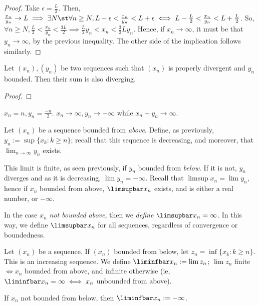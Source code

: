 \documentclass[12pt]{article}
\begin{document}
\begin{proof}
  Take $\epsilon = \frac{L}{2}$. Then, $\frac{x_n}{y_n}\to L \implies \exists N \st \forall n \geq N, L - \epsilon < \frac{x_n}{y_n} < L + \epsilon \iff L - \frac{L}{2} < \frac{x_n}{y_n} < L + \frac{L}{2}$. So, $\forall n \geq N, \frac{L}{2} < \frac{x_n}{y_n} < \frac{3L}{2} \implies \frac{L}{2} y_n < x_n < \frac{3}{2} L y_n$. Hence, if $x_n \to \infty$, it must be that $y_n \to \infty$, by the previous inequality. The other side of the implication follows similarly.
\end{proof}

\begin{proposition}
  Let $(x_n), (y_n)$ be two sequences such that $(x_n)$ is properly divergent and $y_n$ bounded. Then their sum is also diverging.
\end{proposition}

\begin{proof}
\end{proof}

\begin{example}
  $x_n = n, y_n = \frac{-n}{2}$. $x_n \to \infty, y_n \to - \infty$ while $x_n + y_n \to \infty$.
\end{example}

\begin{definition}
  Let $(x_n)$ be a sequence bounded from \emph{above}. Define, as previously, $y_n := \sup \{x_k : k \geq n\}$; recall that this sequence is decreasing, and moreover, that $\lim_{n\to\infty} y_n$ exists. 
  
  This limit is finite, as seen previously, if $y_n$ bounded from \emph{below}. If it is not, $y_n$ diverges and as it is decreasing, $\lim y_n = - \infty$. Recall that $\limsup x_n = \lim y_n$, hence if $x_n$ bounded from above, $\limsupbar x_n$ exists, and is either a real number, or $-\infty$.

  In the case $x_n$ \emph{not bounded above}, then we \emph{define} $\limsupbar x_n = \infty$. In this way, we define $\limsupbar x_n$ for all sequences, regardless of convergence or boundedness.
\end{definition}

\begin{definition}
  Let $(x_n)$ be a sequence. If $(x_n)$ bounded from below, let $z_n = \inf \{x_k : k \geq n\}$. This is an increasing sequence. We define $\liminfbar x_n := \lim z_n$; $\lim z_n $ finite $\iff x_n$ bounded from above, and infinite otherwise (ie, $\liminfbar x_n = \infty \iff x_n$ unbounded from above).

  If $x_n$ not bounded from below, then $\liminfbar x_n := - \infty$.
\end{definition}
\end{document}
